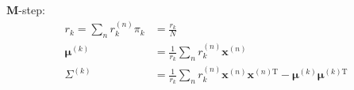 \documentclass{article}
\newcommand{\bm}[1]{\mathbf{#1}}
\newcommand{\vf}[1]{\mathbf{#1}}
\newcommand{\bx}{\vf{x}}
\newcommand{\bmu}{\pmb{\mu}}
\newcommand{\tran}{\text{T}}
\begin{document}
$\bm{M}$-step:
\begin{align*}
    r_k = \sum_n r_k^{(n)}
    \pi_k &= \frac{r_k}{N} \\
    \bmu^{(k)} &= \frac{1}{r_k} \sum_n r_k^{(n)} \bx^{(n)} \\
    \Sigma^{(k)} &= \frac{1}{r_k} \sum_n r_k^{(n)} \bx^{(n)} \bx^{(n)\tran}
        - \bmu^{(k)} \bmu^{(k)\tran}
\end{align*}



\printbibliography
\end{document}
